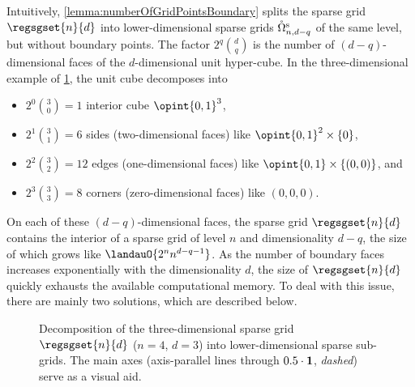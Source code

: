 Intuitively, \cref{lemma:numberOfGridPointsBoundary} splits the sparse grid
$\regsgset{n}{d}$ into lower-dimensional sparse grids
$\interiorregsgset{n}{d-q}$ of the same level, but without boundary points.
The factor $2^q \binom{d}{q}$ is the number of $(d-q)$-dimensional faces
of the $d$-dimensional unit hyper-cube.
In the three-dimensional example of \cref{fig:sgDecompose},
the unit cube decomposes into
\begin{itemize}
  \item
  $2^0 \binom{3}{0} = 1$ interior cube $\opint{0, 1}^3$,
  
  \item
  $2^1 \binom{3}{1} = 6$ sides (two-dimensional faces)
  like $\opint{0, 1}^2 \times \{0\}$,
  
  \item
  $2^2 \binom{3}{2} = 12$ edges (one-dimensional faces)
  like $\opint{0, 1} \times \{(0, 0)\}$, and
  
  \item
  $2^3 \binom{3}{3} = 8$ corners (zero-dimensional faces)
  like $(0, 0, 0)$.
\end{itemize}
On each of these $(d-q)$-dimensional faces,
the sparse grid $\regsgset{n}{d}$ contains
the interior of a sparse grid of level $n$ and dimensionality $d - q$,
the size of which grows like $\landauO{2^n n^{d-q-1}}$.
As the number of boundary faces increases exponentially
with the dimensionality $d$,
the size of $\regsgset{n}{d}$ quickly exhausts the available
computational memory.
To deal with this issue, there are mainly two solutions,
which are described below.

\begin{figure}
  \raisebox{-0.5\height-0.5mm}{$\;\;=\;\;$}%
  \raisebox{-0.5\height}{$\;\;\dotcup\;\;$}%
  \raisebox{-0.5\height}{$\;\;\dotcup\;\;$}%
  \raisebox{-0.5\height}{$\;\;\dotcup\;\;$}%
  \caption[%
    Decomposition of a sparse grid into lower-dimensional sparse sub-grids%
  ]{%
    Decomposition of the three-dimensional sparse grid $\regsgset{n}{d}$
    ($n = 4$, $d = 3$) into lower-dimensional sparse sub-grids.
    The main axes (axis-parallel lines through $0.5 \cdot {\boldsymbol{1}}$, \emph{dashed})
    serve as a visual aid.%
  }%
  \label{fig:sgDecompose}%
\end{figure}



